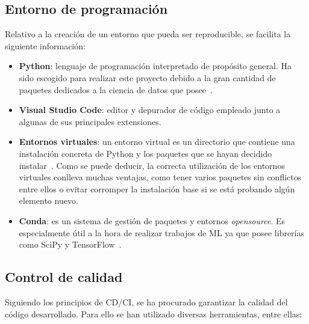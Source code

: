 \subsection{Entorno de programación}

Relativo a la creación de un entorno que pueda ser reproducible, se facilita la siguiente información:

\begin{itemize}
	\item \textbf{Python}: lenguaje de programación interpretado de propósito general. Ha sido escogido para realizar este proyecto debido a la gran cantidad de paquetes dedicados a la ciencia de datos que posee~\cite{python}.
	\item \textbf{Visual Studio Code}: editor y depurador de código empleado junto a algunas de sus principales extensiones.
	\item \textbf{Entornos virtuales}: un entorno virtual es un directorio que contiene una instalación concreta de Python y los paquetes que se hayan decidido instalar~\cite{venvs}. Como se puede deducir, la correcta utilización de los entornos virtuales conlleva muchas ventajas, como tener varios paquetes sin conflictos entre ellos o evitar corromper la instalación base si se está probando algún elemento nuevo.
	\item \textbf{Conda}: es un sistema de gestión de paquetes y entornos \textit{opensource}. Es especialmente útil a la hora de realizar trabajos de ML ya que posee librerías como SciPy y TensorFlow~\cite{conda}.
\end{itemize}

\subsection{Control de calidad}
\label{sec:herramientas_control_calidad}

Siguiendo los principios de CD/CI, se ha procurado garantizar la calidad del código desarrollado. Para ello se han utilizado diversas herramientas, entre ellas:

